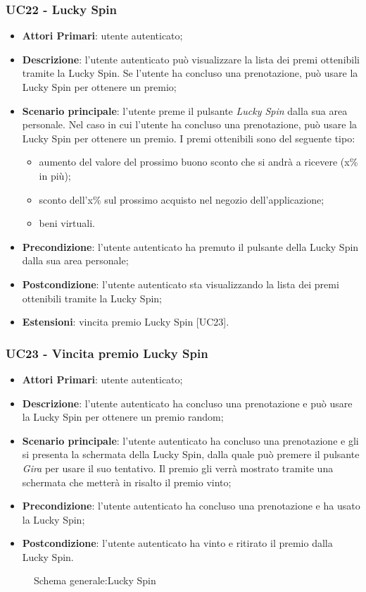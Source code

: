 

\subsubsection{UC22 - Lucky Spin}
\begin{itemize}
	\item \textbf{Attori Primari}: utente autenticato;
	\item \textbf{Descrizione}:	l'utente autenticato può visualizzare la lista dei premi ottenibili tramite la Lucky Spin\glo. Se l'utente ha concluso una prenotazione, può usare la Lucky Spin per ottenere un premio;
	\item \textbf{Scenario principale}: l'utente preme il pulsante \textit{Lucky Spin} dalla sua area personale. Nel caso in cui l'utente ha concluso una prenotazione, può usare la Lucky Spin per ottenere un premio. I premi ottenibili sono del seguente tipo:
	\begin{itemize}
		\item aumento del valore del prossimo buono sconto che si andrà a ricevere (x\% in più);
		\item sconto dell'x\% sul prossimo acquisto nel negozio dell'applicazione;
		\item beni virtuali.
	\end{itemize}
	\item \textbf{Precondizione}: l'utente autenticato ha premuto il pulsante della Lucky Spin dalla sua area personale;
	\item \textbf{Postcondizione}: l'utente autenticato sta visualizzando la lista dei premi ottenibili tramite la Lucky Spin;
	\item \textbf{Estensioni}: vincita premio Lucky Spin [UC23].
\end{itemize}
\subsubsection{UC23 - Vincita premio Lucky Spin}
\begin{itemize}
	\item \textbf{Attori Primari}: utente autenticato;
	\item \textbf{Descrizione}: l'utente autenticato ha concluso una prenotazione e può usare la Lucky Spin per ottenere un premio random;	
	\item \textbf{Scenario principale}: l'utente autenticato ha concluso una prenotazione e gli si presenta la schermata della Lucky Spin, dalla quale può premere il pulsante \textit{Gira} per usare il suo tentativo. Il premio gli verrà mostrato tramite una schermata che metterà in risalto il premio vinto;
	\item \textbf{Precondizione}: l'utente autenticato ha concluso una prenotazione e ha usato la Lucky Spin;
	\item \textbf{Postcondizione}: l'utente autenticato ha vinto e ritirato il premio dalla Lucky Spin.
\end{itemize}

\begin{figure}[h]
	\centering
	\caption{Schema generale:Lucky Spin}
\end{figure}
